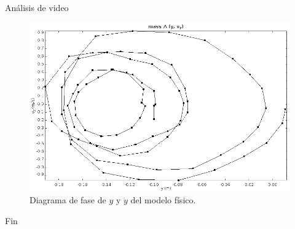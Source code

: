 \documentclass{beamer}
\begin{document}
\begin{frame}{Análisis de video}
 \begin{figure}[h]
 \centering
 \includegraphics[scale=0.2]{../Report/img/tracker_poc_phasediagram_y_vy.png}
 \caption{Diagrama de fase de $y$ y $\dot{y}$ del modelo físico.}
 \label{fig: tracker phase diagram y vy}
\end{figure}

\end{frame}

\begin{frame}{Fin}
 
\end{frame}
\end{document}
